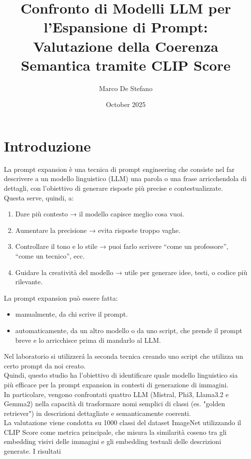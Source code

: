 \documentclass{article}
\title{Confronto di Modelli LLM per l'Espansione di Prompt: 
Valutazione della Coerenza Semantica tramite CLIP Score}
\author{Marco De Stefano}
\date{October 2025}
\begin{document}
\maketitle

\section{Introduzione}
La prompt expansion è una tecnica di prompt engineering che consiste nel far descrivere a un modello linguistico (LLM) una parola o una frase arricchendola di dettagli, con l’obiettivo di generare risposte più precise e contestualizzate.\\
Questa serve, quindi, a:
\begin{enumerate}
    \item Dare più contesto → il modello capisce meglio cosa vuoi. 
    \item Aumentare la precisione → evita risposte troppo vaghe.
    \item Controllare il tono e lo stile → puoi farlo scrivere “come un professore”, “come un tecnico”, ecc.
    \item Guidare la creatività del modello → utile per generare idee, testi, o codice più rilevante.
\end{enumerate}
La prompt expansion può essere fatta:
\begin{itemize}
    \item manualmente, da chi scrive il prompt.
    \item  automaticamente, da un altro modello o da uno script, che prende il prompt breve e lo arricchisce prima di mandarlo al LLM.
\end{itemize}
Nel laboratorio  si utilizzerá la seconda tecnica creando uno script che utilizza un certo prompt da noi creato.\\
Quindi, questo studio ha l'obiettivo di identificare quale modello linguistico sia 
più efficace per la prompt expansion in contesti di generazione di immagini. \\
In particolare, vengono confrontati quattro LLM (Mistral, Phi3, Llama3.2 e Gemma2) 
nella capacità di trasformare nomi semplici di classi (es. "golden retriever") 
in descrizioni dettagliate e semanticamente coerenti.\\La valutazione viene 
condotta su 1000 classi del dataset ImageNet utilizzando il CLIP Score come 
metrica principale, che misura la similarità coseno tra gli embedding visivi 
delle immagini e gli embedding testuali delle descrizioni generate. I risultati 
\end{document}
